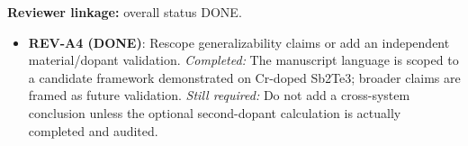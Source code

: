 \textbf{Reviewer linkage:} overall status DONE.
\begin{itemize}[leftmargin=1.4em,noitemsep]
\item \textbf{REV-A4 (DONE)}: Rescope generalizability claims or add an independent material/dopant validation. \emph{Completed:} The manuscript language is scoped to a candidate framework demonstrated on Cr-doped Sb2Te3; broader claims are framed as future validation. \emph{Still required:} Do not add a cross-system conclusion unless the optional second-dopant calculation is actually completed and audited.
\end{itemize}
